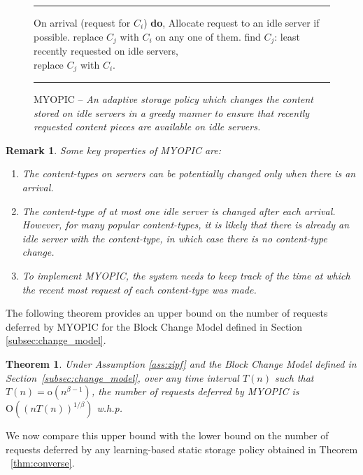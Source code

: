 \documentclass[10pt, conference, letterpaper]{IEEEtran}
\newtheorem{remark}{Remark}
\newtheorem{theorem}{Theorem}
\def \OO {\mathrm{O}}
\def \oo {\mathrm{o}}
\begin{document}
\begin{figure}[h]
	\hrule
	\vspace{0.1in}
	\begin{algorithmic}[1]
		\STATE On arrival (request for $C_i$) \textbf{do},
		\STATE Allocate request to an idle server if possible.
		\STATE replace $C_j$ with $C_i$ on any one of them.
		\ELSE
		\STATE find $C_j$: least recently requested on idle servers,\\ replace $C_j$ with $C_i$.
		\ENDIF
		\ENDIF
\end{algorithmic}
	\vspace{0.1in}
	\hrule
	\caption{MYOPIC -- \sl An adaptive storage policy which changes the content stored on idle servers in a greedy manner to ensure that recently requested content pieces are available on idle servers.}
	\label{fig:MYOPIC}
\end{figure}

\begin{remark} Some key properties of MYOPIC are:
	\begin{enumerate}
		\item The content-types on servers can be potentially changed only when
		there is an arrival.
		
		\item The content-type of at most one idle server is changed after each
		arrival. However, for many popular content-types, it is likely that
		there is already an idle server with the content-type, in which case
		there is no content-type change.
		
		\item To implement MYOPIC, the system needs to keep track of the time
		at which the recent most request of each content-type was made.
		
	\end{enumerate}
\end{remark}

The following theorem provides an upper bound on the number of
requests deferred by MYOPIC for the Block Change Model defined in Section
\ref{subsec:change_model}.
\begin{theorem}
	\label{thm:MYOPIC_static_arrival_rates}
	Under Assumption \ref{ass:zipf} and the Block Change Model defined in
	Section~\ref{subsec:change_model}, over any time interval $T(n)$ such
	that $T(n) = \oo(n^{\beta-1})$, the number of requests deferred by
	MYOPIC is $\OO((nT(n))^{1/\beta})$ w.h.p.
\end{theorem}
We now compare this upper bound with the lower bound on the number of
requests deferred by any learning-based static storage policy obtained
in Theorem ~\ref{thm:converse}. 
\end{document}
